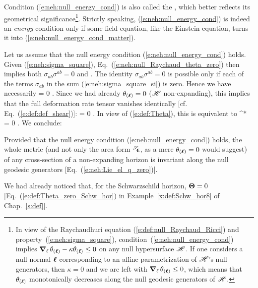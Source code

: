 \begin{remark}
Condition (\ref{e:neh:null_energy_cond}) is also called
the  \cite{HawkiE73,Senov22,SenovG15}, which better reflects its geometrical
significance\footnote{In view of the Raychaudhuri equation (\ref{e:def:null_Raychaud_Ricci})
and property~(\ref{e:neh:sigma_square}),
condition~(\ref{e:neh:null_energy_cond}) implies
$\bm{\nabla}_{\ell}\,  \theta_{(\bm{\ell})} -  \kappa \theta_{(\bm{\ell})}\leq 0$ on any null hypersurface
$\mathscr{H}$. If one considers
a null normal $\bm{\ell}$ corresponding to an affine parametrization of $\mathscr{H}$'s null generators,
then $\kappa=0$ and we are left with $\bm{\nabla}_{\ell}\,  \theta_{(\bm{\ell})} \leq 0$, which means
that $\theta_{(\bm{\ell})}$ monotonically decreases along the null geodesic generators of $\mathscr{H}$.}.
Strictly speaking, (\ref{e:neh:null_energy_cond})
is indeed an \emph{energy} condition only if some field equation, like the Einstein equation,
turns it into (\ref{e:neh:null_energy_cond_matter}).
\end{remark}

Let us assume that the null energy condition (\ref{e:neh:null_energy_cond})
holds. Given (\ref{e:neh:sigma_square}),
Eq.~(\ref{e:neh:null_Raychaud_theta_zero}) then implies both
$\sigma_{ab} \sigma^{ab}  = 0$
and
\be \label{e:neh:R_l_l_zero}
    .
\ee
The identity $\sigma_{ab} \sigma^{ab} = 0$ is possible only if each of
the terms $\sigma_{ab}$ in the sum (\ref{e:neh:sigma_square_si}) is zero. Hence we have necessarily
\be
    \w{\sigma} = 0 .
\ee
Since we had already $\theta_{(\bm{\ell})}=0$ ($\mathscr{H}$ non-expanding), this implies that the full deformation rate tensor
vanishes identically [cf. Eq.~(\ref{e:def:def_shear})]:
\be
    \w{\Theta} = 0 .
\ee
In view of (\ref{e:def:Theta}), this is equivalent to
\be \label{e:neh:Lie_el_q_zero}
     ^* \Lie{\el}  = 0 .
\ee
We conclude:
\begin{prop}
\label{p:neh:invariance_of_2metric}
Provided that the null energy condition (\ref{e:neh:null_energy_cond})
holds,
the whole metric (and not only the area form
${}^{\mathscr{S}}\!\!\bm{\epsilon}$, as a mere $\theta_{(\bm{\ell})}=0$ would suggest) of any cross-section
of a non-expanding horizon is invariant along the null geodesic generators
[Eq.~(\ref{e:neh:Lie_el_q_zero})].
\end{prop}

\begin{example}
We had already noticed that, for the Schwarzschild horizon, $\bm{\Theta}=0$
[Eq.~(\ref{e:def:Theta_zero_Schw_hor}) in Example~\ref{x:def:Schw_hor8}
of Chap.~\ref{s:def}].
\end{example}

